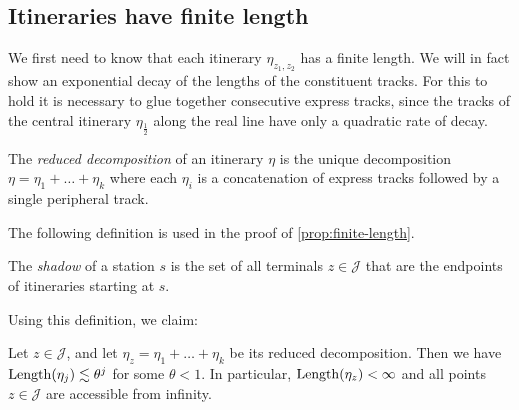 \subsection{Itineraries have finite length}
We first need to know that each itinerary $\eta_{z_1,z_2}$ has a finite length. We will in fact show an exponential decay of the lengths of the constituent tracks. For this to hold it is necessary to glue together consecutive express tracks, since the tracks of the central itinerary $\eta_{\frac 12}$ along the real line have only a quadratic rate of decay.

\begin{definition}
	The \emph{reduced decomposition} of an itinerary $\eta$ is the unique decomposition $\eta=\eta_1+\dots+\eta_k$ where each $\eta_i$ is a concatenation of express tracks followed by a single peripheral track.
\end{definition}

The following definition is used in the proof of \cref{prop:finite-length}.
\begin{definition}
	The \emph{shadow} of a station $s$ is the set of all terminals $z\in \mathcal J$ that are the endpoints of itineraries starting at $s$.
\end{definition}

Using this definition, we claim:
\begin{proposition} \label{prop:finite-length}
	Let $z \in \mathcal J$, and let $\eta_z=\eta_1+\dots+\eta_k$ be its reduced decomposition. Then we have $\operatorname{Length}(\eta_j)\lesssim \theta^j$ for some $\theta < 1$. In particular, $\operatorname{Length}(\eta_z)<\infty$ and all points $z\mathcal \in \mathcal J$ are accessible from infinity.
\end{proposition}

